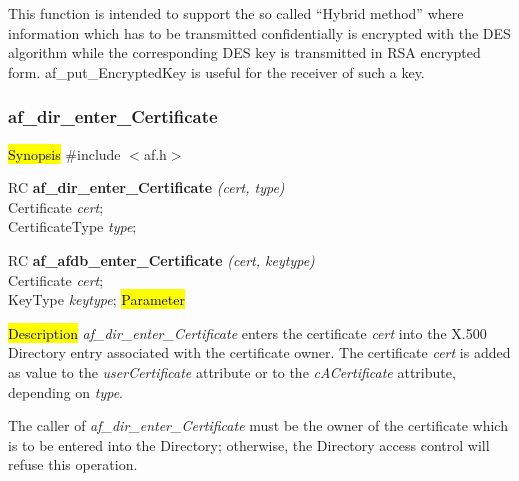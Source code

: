This function is intended to support the so called ``Hybrid method'' where information which
has to be transmitted confidentially is encrypted with the DES algorithm while the corresponding DES key
is transmitted in RSA encrypted form. af\_put\_EncryptedKey is useful for the receiver
of such a key.

\subsubsection{af\_dir\_enter\_Certificate}
\label{af_enter_Certificate}
\hl{Synopsis}
\#include $<$af.h$>$ 

RC {\bf af\_dir\_enter\_Certificate} {\em (cert, type)} \\
Certificate {\em *cert}; \\
CertificateType {\em type}; 

RC {\bf af\_afdb\_enter\_Certificate} {\em (cert, keytype)} \\
Certificate {\em *cert}; \\
KeyType {\em keytype};
\hl{Parameter}



\hl{Description}
{\em af\_dir\_enter\_Certificate} enters the certificate {\em cert} into the X.500 Directory 
entry associated with the certificate owner. The certificate {\em cert} is added as value
to the {\em userCertificate} attribute or to the {\em cACertificate} attribute,
depending on {\em type}.

The caller of {\em af\_dir\_enter\_Certificate} must be the owner of the certificate 
which is to be entered into the Directory; otherwise, the Directory access 
control will refuse this operation.


